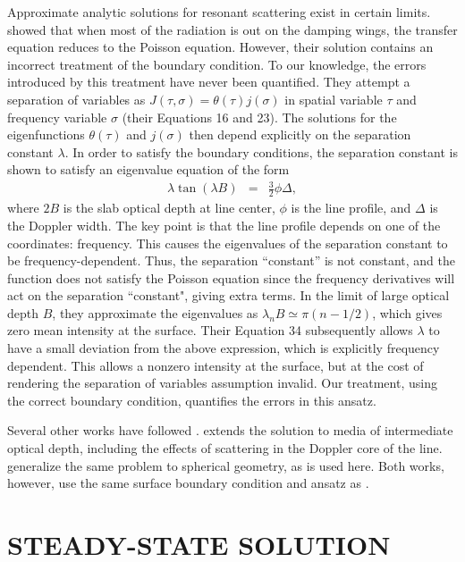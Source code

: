 \documentclass[linenumbers]{aastex63}
\newcommand{\be}{\begin{eqnarray}}
\newcommand{\ee}{\end{eqnarray}}
\begin{document}
Approximate analytic solutions for resonant scattering exist in certain limits. \citet{1973MNRAS.162...43H} showed that when most of the radiation is out on the damping wings, the transfer equation reduces to the Poisson equation. However, their solution contains an incorrect treatment of the boundary condition. To our knowledge, the errors introduced by this treatment have never been quantified. They attempt a separation of variables as $J(\tau,\sigma) = \theta(\tau) j(\sigma)$ in spatial variable $\tau$ and frequency variable $\sigma$ (their Equations 16 and 23). The solutions for the eigenfunctions $\theta(\tau)$ and $j(\sigma)$ then depend explicitly on the separation constant $\lambda$. In order to satisfy the boundary conditions, the separation constant is shown to satisfy an eigenvalue equation of the form
\be
\lambda \tan(\lambda B) & = & \frac{3}{2} \phi \Delta,
\label{eq:evalue}
\ee
where $2B$ is the slab optical depth at line center, $\phi$ is the line profile, and $\Delta$ is the Doppler width. The key point is that the line profile depends on one of the coordinates: frequency. This causes the eigenvalues of the separation constant to be frequency-dependent. Thus, the separation ``constant'' is not constant, and the function does not satisfy the Poisson equation since the frequency derivatives will act on the separation ``constant", giving extra terms. In the limit of large optical depth $B$, they approximate the eigenvalues as $\lambda_n B \simeq \pi (n-1/2)$, which gives zero mean intensity at the surface. Their Equation 34 subsequently allows $\lambda$ to have a small deviation from the above expression, which is explicitly frequency dependent. This allows a nonzero intensity at the surface, but at the cost of rendering the separation of variables assumption invalid. Our treatment, using the correct boundary condition, quantifies the errors in this ansatz.

Several other works have followed \citet{1973MNRAS.162...43H}. \citet{1990ApJ...350..216N} extends the solution to media of intermediate optical depth, including the effects of scattering in the Doppler core of the line. \citet{2006ApJ...649...14D} generalize the same problem to spherical geometry, as is used here. Both works, however, use the same surface boundary condition and ansatz as \citet{1973MNRAS.162...43H}.

\section{STEADY-STATE SOLUTION}
\label{sec:steadystate}
\end{document}
